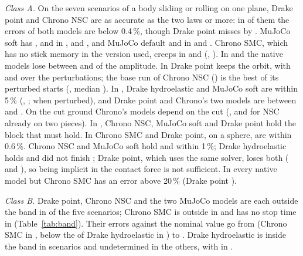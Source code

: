 \emph{Class A.} On the seven scenarios of a body sliding or rolling on one plane, Drake point
and Chrono NSC are as accurate as the two laws or more: in
 of them the errors of both models are below 0.4\,\%,
though Drake point misses  by . MuJoCo soft has
,  and  in
,  and , and MuJoCo default 
and  in  and . Chrono SMC, which has
no stick memory in the version used, creeps in  and 
(, ). In  and  the native
models lose between  and  of the amplitude. In
 Drake point keeps the orbit, with  and
 over the perturbations; the base run of Chrono NSC
() is the best of its perturbed starts
(, median ). In
, Drake hydroelastic and MuJoCo soft are within 5\,\% (,
;  when perturbed), and Drake
point and Chrono's two models are between  and
. On the cut ground Chrono's models depend on the cut
(, and  for NSC already on two pieces). In
, Chrono NSC, MuJoCo soft and Drake point hold the block that must hold. In
 Chrono SMC and Drake point, on a sphere, are within 0.6\,\%. Chrono NSC and MuJoCo
soft hold  and  within 1\,\%; Drake hydroelastic holds 
and did not finish ; Drake point, which uses the same solver, loses both
( and ), so being implicit in the contact
force is not sufficient. In  every native model but Chrono SMC has an error above
20\,\% (Drake point ).

\emph{Class B.} Drake point, Chrono NSC and the two MuJoCo models are each outside the band in
 of the five scenarios; Chrono SMC is outside in
 and has no stop time in 
(Table~\ref{tab:band}). Their errors against the nominal value go from 
(Chrono SMC in , below the  of Drake hydroelastic in
) to . Drake hydroelastic is inside the band in
 scenarios and undetermined in the others, with 
in .

